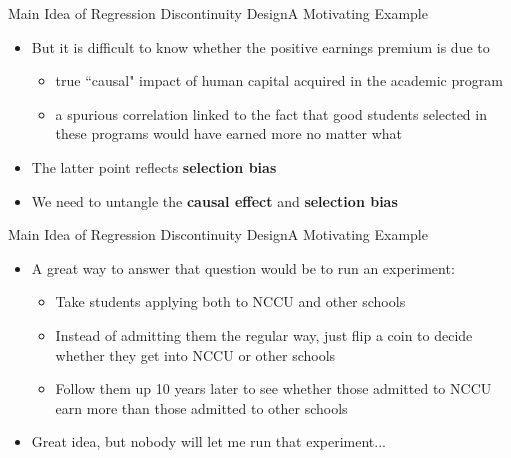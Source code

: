 \documentclass[hyperref={pdfpagelabels=false}]{beamer}
\begin{document}
	
	
	
	\begin{frame}{Main Idea of Regression Discontinuity Design}{A Motivating Example}
		\begin{itemize}
			
			\item But it is difficult to know whether the positive earnings premium is
			due to
			\vspace{0.2cm}
			\begin{itemize}
				
				\item true ``causal" impact of human capital acquired in the academic program
				\vspace{0.2cm}
				\item a spurious correlation linked to the fact that good students selected in these
				programs would have earned more no matter what
				\vspace{0.2cm}
			\end{itemize}
			\item The latter point reflects \textbf{selection bias}
			\vspace{0.2cm}
			\item We need to untangle the \textbf{causal effect} and \textbf{selection bias}
			
		\end{itemize}
	\end{frame}
	
	
	\begin{frame}{Main Idea of Regression Discontinuity Design}{A Motivating Example}
		\begin{itemize}
			
			
			\item A great way to answer that question would be to run an experiment:
			\vspace{0.2cm}
			\begin{itemize}
				\item Take students applying both to NCCU and other schools
				\vspace{0.2cm}
				\item Instead of admitting them the regular way, just flip a coin to decide whether they
				get into NCCU or other schools
				\vspace{0.2cm}
				\item Follow them up 10 years later to see whether those admitted to NCCU earn more than those admitted to other schools
				\vspace{0.2cm}
			\end{itemize}
			
			\item Great idea, but nobody will let me run that experiment...
			
			
		\end{itemize}
	\end{frame}
	
\end{document}
